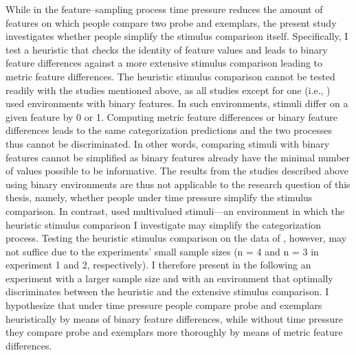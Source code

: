 \documentclass[a4paper,man,natbib]{apa6}
\begin{document}
While in the feature--sampling process time pressure reduces the amount of features on which people compare two probe and exemplars, the present study investigates whether people simplify the stimulus comparison itself. Specifically, I test a heuristic that checks the identity of feature values and leads to binary feature differences against a more extensive stimulus comparison leading to metric feature differences. The heuristic stimulus comparison cannot be tested readily with the studies mentioned above, as all studies except for one (i.e., \citealp{lamberts1997fast}) used environments with binary features. In such environments, stimuli differ on a given feature by 0 or 1. Computing metric feature differences or binary feature differences leads to the same categorization predictions and the two processes thus cannot be discriminated. In other words, comparing stimuli with binary features cannot be simplified as binary features already have the minimal number of values possible to be informative. The results from the studies described above using binary environments \citep{lamberts1995categorization, lamberts1998time, lamberts1999building, lamberts1999categorization} are thus not applicable to the research question of this thesis, namely, whether people under time pressure simplify the stimulus comparison. In contrast, \cite{lamberts1997fast} used multivalued stimuli---an environment in which the heuristic stimulus comparison I investigate may simplify the categorization process. Testing the heuristic stimulus comparison on the data of \citeauthor{lamberts1997fast}, however, may not suffice due to the experiments' small sample sizes (n = 4 and n = 3 in experiment 1 and 2, respectively). I therefore present in the following an experiment with a larger sample size and with an environment that optimally discriminates between the heuristic and the extensive stimulus comparison. I hypothesize that under time pressure people compare probe and exemplars heuristically by means of binary feature differences, while without time pressure they compare probe and exemplars more thoroughly by means of metric feature differences. 
\end{document}
